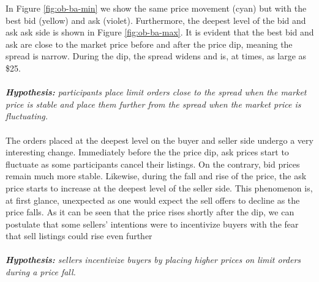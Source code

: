 In Figure \ref{fig:ob-ba-min} we show the same price movement (cyan) but with the best bid (yellow) and ask (violet).
Furthermore, the deepest level of the bid and ask ask side is shown in Figure \ref{fig:ob-ba-max}.
It is evident that the best bid and ask are close to the market price before and after the price dip, meaning the spread is narrow.
During the dip, the spread widens and is, at times, as large as \$25.
\\
\\
\textit{\textbf{Hypothesis:} participants place limit orders close to the spread when the market price is stable and place them further from the spread when the market price is fluctuating.}
\\
\\
The orders placed at the deepest level on the buyer and seller side undergo a very interesting change.
Immediately before the the price dip, ask prices start to fluctuate as some participants cancel their listings.
On the contrary, bid prices remain much more stable.
Likewise, during the fall and rise of the price, the ask price starts to increase at the deepest level of the seller side. 
This phenomenon is, at first glance, unexpected as one would expect the sell offers to decline as the price falls.
As it can be seen that the price rises shortly after the dip, we can postulate that some sellers' intentions were to incentivize buyers with the fear that sell listings could rise even further
\\
\\
\textit{\textbf{Hypothesis:} sellers incentivize buyers by placing higher prices on limit orders during a price fall.}
%
